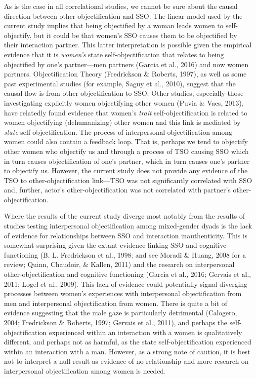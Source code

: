 \documentclass[man]{apa6}
\begin{document}
As is the case in all correlational studies, we cannot be sure about the
causal direction between other-objectification and SSO. The linear model
used by the current study implies that being objectified by a woman
leads women to self-objectify, but it could be that women's SSO causes
them to be objectified by their interaction partner. This latter
interpretation is possible given the empirical evidence that it is
\emph{women's} state self-objectification that relates to being
objectified by one's partner---men partners (Garcia et al., 2016) and
now women partners. Objectification Theory (Fredrickson \& Roberts,
1997), as well as some past experimental studies (for example, Saguy et
al., 2010), suggest that the causal flow is from other-objectification
to SSO. Other studies, especially those investigating explicitly women
objectifying other women (Puvia \& Vaes, 2013), have relatedly found
evidence that women's \emph{trait} self-objectification is related to
women objectifying (dehumanizing) other women and this link is mediated
by \emph{state} self-objectification. The process of interpersonal
objectification among women could also contain a feedback loop. That is,
perhaps we tend to objectify other women who objectify us and through a
process of TSO causing SSO which in turn causes objectification of one's
partner, which in turn causes one's partner to objectify us. However,
the current study does not provide any evidence of the TSO to
other-objectification link---TSO was not significantly correlated with
SSO and, further, actor's other-objectification was not correlated with
partner's other-objectification.

Where the results of the current study diverge most notably from the
results of studies testing interpersonal objectification among
mixed-gender dyads is the lack of evidence for relationships between SSO
and interaction inauthenticity. This is somewhat surprising given the
extant evidence linking SSO and cognitive functioning (B. L. Fredrickson
et al., 1998; and see Moradi \& Huang, 2008 for a review; Quinn,
Chaudoir, \& Kallen, 2011) and the research on interpersonal
other-objectification and cognitive functioning (Garcia et al., 2016;
Gervais et al., 2011; Logel et al., 2009). This lack of evidence could
potentially signal diverging processes between women's experiences with
interpersonal objectification from men and interpersonal objectification
from women. There is quite a bit of evidence suggesting that the male
gaze is particularly detrimental (Calogero, 2004; Fredrickson \&
Roberts, 1997; Gervais et al., 2011), and perhaps the
self-objectification experienced within an interaction with a women is
qualitatively different, and perhaps not as harmful, as the state
self-objectification experienced within an interaction with a man.
However, as a strong note of caution, it is best not to interpret a null
result as evidence of no relationship and more research on interpersonal
objectification among women is needed.
\end{document}
